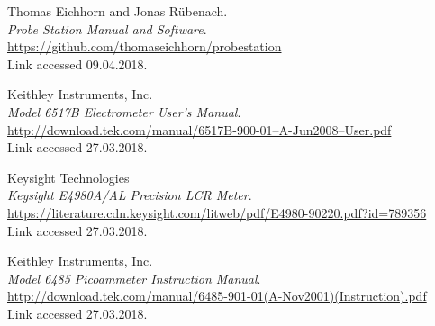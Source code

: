 \documentclass[a4paper]{article}
\begin{document}
\newpage
\begin{thebibliography}{}

 Thomas Eichhorn and Jonas R\"ubenach.\\ {\em Probe Station Manual and Software}.\\ \href{https://github.com/thomaseichhorn/probestation}{https://github.com/thomaseichhorn/probestation}\\ Link accessed 09.04.2018.

 Keithley Instruments, Inc.\\ {\em Model 6517B Electrometer User’s Manual}.\\ \href{http://download.tek.com/manual/6517B-900-01--A-Jun2008--User.pdf}{http://download.tek.com/manual/6517B-900-01--A-Jun2008--User.pdf}\\ Link accessed 27.03.2018.

 Keysight Technologies\\ {\em Keysight E4980A/AL Precision LCR Meter}.\\ \href{https://literature.cdn.keysight.com/litweb/pdf/E4980-90220.pdf?id=789356}{https://literature.cdn.keysight.com/litweb/pdf/E4980-90220.pdf?id=789356}\\ Link accessed 27.03.2018.

 Keithley Instruments, Inc.\\ {\em Model 6485 Picoammeter Instruction Manual}.\\ \href{http://download.tek.com/manual/6485-901-01(A-Nov2001)(Instruction).pdf}{http://download.tek.com/manual/6485-901-01(A-Nov2001)(Instruction).pdf}\\ Link accessed 27.03.2018.

\end{thebibliography}
\end{document}
